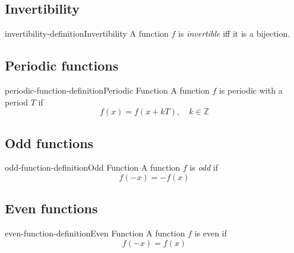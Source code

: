 \documentclass[preview]{standalone}
\begin{document}
\subsection{Invertibility}

\begin{snippetdefinition}{invertibility-definition}{Invertibility}
    A function \(f\) is \textit{invertible} iff it is a bijection.
\end{snippetdefinition}

\subsection{Periodic functions}

\begin{snippetdefinition}{periodic-function-definition}{Periodic Function}
    A function \(f\) is periodic with a period \(T\) if
    \[
        f(x) = f(x + kT), \quad k \in \mathbb{Z}
    \]
\end{snippetdefinition}

\subsection{Odd functions}

\begin{snippetdefinition}{odd-function-definition}{Odd Function}
    A function \(f\) is \textit{odd} if
    \[
        f(-x) = -f(x)
    \]
\end{snippetdefinition}

\subsection{Even functions}

\begin{snippetdefinition}{even-function-definition}{Even Function}
    A function \(f\) is even if
    \[
        f(-x) = f(x)
    \]
\end{snippetdefinition}
\end{document}
